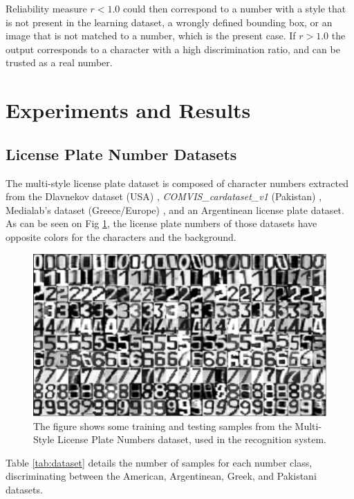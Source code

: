 \documentclass{ipol}
\begin{document}
Reliability measure $r<1.0$ could then correspond to a number with a style that is not present in the learning dataset, a wrongly defined bounding box, or an image that is not matched to a number, which is the present case.
If $r>1.0$ the output corresponds to a character with a high discrimination ratio, and can be trusted as a real number.



\section{Experiments and Results}

\subsection{License Plate Number Datasets}

The multi-style license plate dataset is composed of character numbers extracted from the Dlavnekov dataset (USA) \cite{Dlagnekov:dataset,Dlagnekov:2005}, \textit{COMVIS\_cardataset\_v1} (Pakistan) \cite{comvis_dataset}, Medialab's dataset (Greece/Europe) \cite{medialab_greece}, and an Argentinean license plate dataset. 
As can be seen on Fig \ref{fig:dataset}, the license plate numbers of those datasets have opposite colors for the characters and the background.

\begin{figure}[!htbp]
\begin{center}
\includegraphics[width=.7\linewidth]{dataset.pdf}
\caption{The figure shows some training and testing samples from the Multi-Style License Plate Numbers dataset, used in the recognition system.}
\label{fig:dataset}
\end{center}
\end{figure}

Table \ref{tab:dataset} details the number of samples for each number class, discriminating between the American, Argentinean, Greek, and Pakistani datasets.
\end{document}
